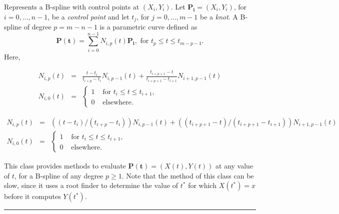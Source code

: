 
Represents a B-spline with control points at
$(X_i, Y_i)$.
Let $\mathbf{P_i}=(X_i, Y_i)$, for $i=0,\ldots,n-1$, be a \emph{control point} and
let $t_j$, for $j=0,\ldots,m-1$ be a \emph{knot}.
A B-spline \cite{mDEB78a} of degree $p=m-n-1$ is a parametric curve defined as
\[\mathbf{P(t)} = \sum_{i=0}^{n-1} N_{i, p}(t) \mathbf{P_i},\mbox{ for }t_p\le t\le t_{m-p-1}.\]
Here,
\begin{latexonly}%
\begin{eqnarray*}
N_{i, p}(t) &=&
\frac{t-t_i}{t_{i+p} - t_i}N_{i, p-1}(t)
+ \frac{t_{i+p+1} - t}{t_{i+p+1} - t_{i+1}}N_{i+1, p-1}(t)\\[7pt]
N_{i, 0}(t) &=& \left\{\begin{array}{ll}
1&\mbox{ for }t_i\le t\le t_{i+1},\\
0&\mbox{ elsewhere}.
\end{array}\right.
\end{eqnarray*}
\end{latexonly}%
\begin{htmlonly}
\begin{eqnarray*}
N_{i, p}(t) &=&
((t-t_i)/(t_{i+p} - t_i))N_{i, p-1}(t)
+ ((t_{i+p+1} - t)/(t_{i+p+1} - t_{i+1})) N_{i+1, p-1}(t)\\[7pt]
N_{i, 0}(t) &=& \left\{\begin{array}{ll}
1&\mbox{ for }t_i\le t\le t_{i+1},\\
0&\mbox{ elsewhere}.
\end{array}\right.
\end{eqnarray*}
\end{htmlonly}%


This class provides methods to evaluate
$\mathbf{P(t)}=(X(t), Y(t))$ at any value of $t$,
for a B-spline of any degree $p\ge 1$.
Note that the
 method
of this class can be slow, since it
uses a root finder to determine
the value of $t^*$ for which $X(t^*)=x$
before it computes $Y(t^*)$.

\bigskip\hrule


